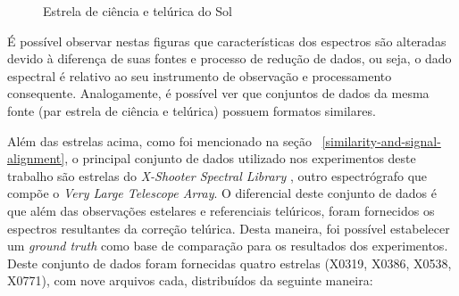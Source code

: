 \begin{figure}[htb]
  \centering
  \hfill
  \caption{Estrela de ciência e telúrica do Sol}
  \label{fig:two-stars-sun}
\end{figure}

É possível observar nestas figuras que características dos espectros são alteradas devido à diferença de suas fontes e processo de redução de dados, ou seja, o dado espectral é relativo ao seu instrumento de observação e processamento consequente. Analogamente, é possível ver que conjuntos de dados da mesma fonte (par estrela de ciência e telúrica) possuem formatos similares.

Além das estrelas acima, como foi mencionado na seção ~\ref{similarity-and-signal-alignment}, o principal conjunto de dados utilizado nos experimentos deste trabalho são estrelas do \textit{X-Shooter Spectral Library} \citep{Chen2014TheXS}, outro espectrógrafo que compõe o \textit{Very Large Telescope Array}. O diferencial deste conjunto de dados é que além das observações estelares e referenciais telúricos, foram fornecidos os espectros resultantes da correção telúrica. Desta maneira, foi possível estabelecer um \textit{ground truth} como base de comparação para os resultados dos experimentos. Deste conjunto de dados foram fornecidas quatro estrelas (X0319, X0386, X0538, X0771), com nove arquivos cada, distribuídos da seguinte maneira:


